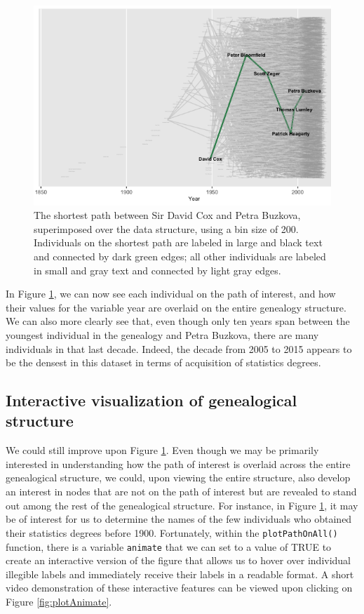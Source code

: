 \documentclass[11pt,a4paper,oldfontcommands,openany]{memoir}
\numberwithin{equation}{section} %
\newcommand{\code}[1]{{\texttt{#1}}}
\begin{document}
\begin{figure}[H]
    \begin{framed}
    \centering
    \includegraphics[width=\textwidth]{plotCBNoText}
    \end{framed}
    \caption{The shortest path between Sir David Cox and Petra Buzkova, superimposed over the data structure, using a bin size of 200. Individuals on the shortest path are labeled in large and black text and connected by dark green edges; all other individuals are labeled in small and gray text and connected by light gray edges.}
    \label{fig:plotCBNoText}
\end{figure}

In Figure \ref{fig:plotCBNoText}, we can now see each individual on the path of interest, and how their values for the variable year are overlaid on the entire genealogy structure. We can also more clearly see that, even though only ten years span between the youngest individual in the genealogy and Petra Buzkova, there are many individuals in that last decade. Indeed, the decade from 2005 to 2015 appears to be the densest in this dataset in terms of acquisition of statistics degrees.

\subsection{Interactive visualization of genealogical structure}

We could still improve upon Figure \ref{fig:plotCBNoText}. Even though we may be primarily interested in understanding how the path of interest is overlaid across the entire genealogical structure, we could, upon viewing the entire structure, also develop an interest in nodes that are not on the path of interest but are revealed to stand out among the rest of the genealogical structure. For instance, in Figure \ref{fig:plotCBNoText}, it may be of interest for us to determine the names of the few individuals who obtained their statistics degrees before 1900. Fortunately, within the \code{plotPathOnAll()} function, there is a variable \code{animate} that we can set to a value of TRUE to create an interactive version of the figure that allows us to hover over individual illegible labels and immediately receive their labels in a readable format. A short video demonstration of these interactive features can be viewed upon clicking on Figure \ref{fig:plotAnimate}.
\end{document}
